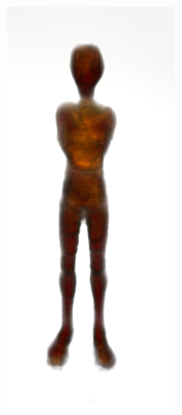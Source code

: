 \begin{figure}[ht]
\begin{subfigure}[b]{0.12\textwidth}
        \includegraphics[width=\textwidth]{figures/appendix/bias_poor_dreamfusion_part1.png}

\end{subfigure}
\end{figure}
